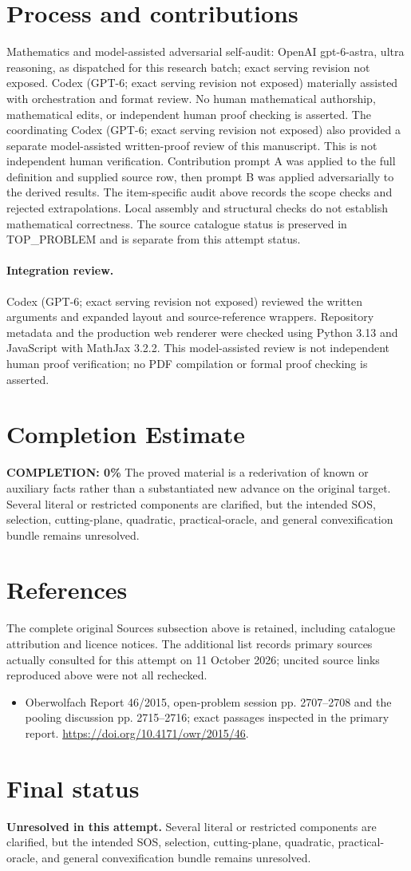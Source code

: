 \documentclass[11pt]{article}
\begin{document}
\section{Process and contributions}
Mathematics and model-assisted adversarial self-audit: OpenAI gpt-6-astra, ultra reasoning, as dispatched for this research batch; exact serving revision not exposed. Codex (GPT-6; exact serving revision not exposed) materially assisted with orchestration and format review. No human mathematical authorship, mathematical edits, or independent human proof checking is asserted.
The coordinating Codex (GPT-6; exact serving revision not exposed) also provided a separate model-assisted written-proof review of this manuscript. This is not independent human verification.
Contribution prompt A was applied to the full definition and supplied source row, then prompt B was applied adversarially to the derived results. The item-specific audit above records the scope checks and rejected extrapolations. Local assembly and structural checks do not establish mathematical correctness. The source catalogue status is preserved in TOP\_PROBLEM and is separate from this attempt status.
\paragraph{Integration review.} Codex (GPT-6; exact serving revision not exposed) reviewed the written arguments and expanded layout and source-reference wrappers. Repository metadata and the production web renderer were checked using Python 3.13 and JavaScript with MathJax 3.2.2. This model-assisted review is not independent human proof verification; no PDF compilation or formal proof checking is asserted.

\section{Completion Estimate}
\noindent\textbf{COMPLETION: 0\%}
The proved material is a rederivation of known or auxiliary facts rather than a substantiated new advance on the original target. Several literal or restricted components are clarified, but the intended SOS, selection, cutting-plane, quadratic, practical-oracle, and general convexification bundle remains unresolved.
\section{References}
The complete original Sources subsection above is retained, including catalogue attribution and licence notices. The additional list records primary sources actually consulted for this attempt on 11 October 2026; uncited source links reproduced above were not all rechecked.
\begin{itemize}
\item Oberwolfach Report 46/2015, open-problem session pp. 2707--2708 and the pooling discussion pp. 2715--2716; exact passages inspected in the primary report. \url{https://doi.org/10.4171/owr/2015/46}.
\end{itemize}
\section{Final status}
\textbf{Unresolved in this attempt.} Several literal or restricted components are clarified, but the intended SOS, selection, cutting-plane, quadratic, practical-oracle, and general convexification bundle remains unresolved.
\end{document}
